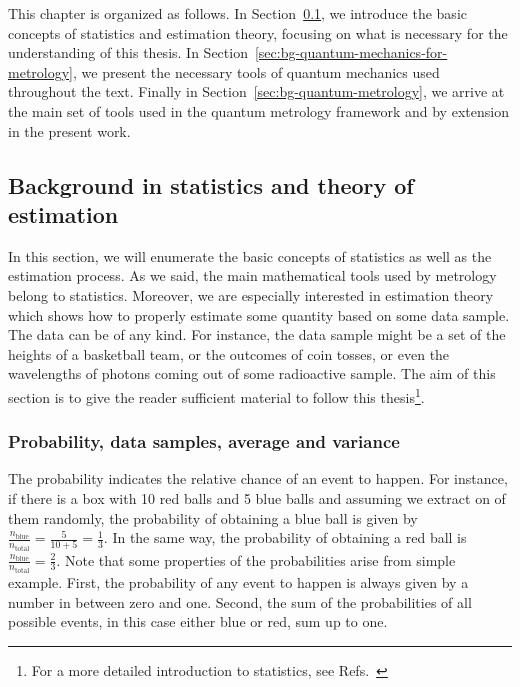 This chapter is organized as follows.
In Section~\ref{sec:bg-statistics-and-stimation}, we introduce the basic concepts of statistics and estimation theory, focusing on what is necessary for the understanding of this thesis.
In Section~\ref{sec:bg-quantum-mechanics-for-metrology}, we present the necessary tools of quantum mechanics used throughout the text.
Finally in Section~\ref{sec:bg-quantum-metrology}, we arrive at the main set of tools used in the quantum metrology framework and by extension in the present work.

\subsection{Background in statistics and theory of estimation}
\label{sec:bg-statistics-and-stimation}

In this section, we will enumerate the basic concepts of statistics as well as the estimation process.
As we said, the main mathematical tools used by metrology belong to statistics.
Moreover, we are especially interested in estimation theory which shows how to properly estimate some quantity based on some data sample.
The data can be of any kind.
For instance, the data sample might be a set of the heights of a basketball team, or the outcomes of coin tosses, or even the wavelengths of photons coming out of some radioactive sample.
The aim of this section is to give the reader sufficient material to follow this thesis\footnote{
For a more detailed introduction to statistics, see Refs.~\cite{Riley2006, Barlow1989}}.

\subsubsection{Probability, data samples, average and variance}

The probability indicates the relative chance of an event to happen.
For instance, if there is a box with 10 red balls and 5 blue balls and assuming we extract on of them randomly, the probability of obtaining a blue ball is given by $\frac{n_{\text{blue}}}{n_{\text{total}}}=\frac{5}{10+5}=\frac{1}{3}$.
In the same way, the probability of obtaining a red ball is $\frac{n_{\text{blue}}}{n_{\text{total}}}=\frac{2}{3}$.
Note that some properties of the probabilities arise from simple example.
First, the probability of any event to happen is always given by a number in between zero and one.
Second, the sum of the probabilities of all possible events, in this case either blue or red, sum up to one.


